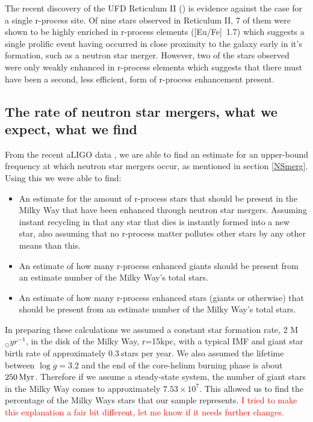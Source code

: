 \documentclass[a4paper,fleqn,usenatbib]{mnras}
\newcommand{\todo}[1]{\textcolor{red}{#1}}
\begin{document}
	The recent discovery of the UFD Reticulum II (\cite{Ji2016}) is evidence against the case for a single r-process site. Of nine stars observed in Reticulum II, 7 of them were shown to be highly enriched in r-process elements ([Eu/Fe]~1.7) which suggests a single prolific event having occurred in close proximity to the galaxy early in it's formation, such as a neutron star merger. However, two of the stars observed were only weakly enhanced in r-process elements which suggests that there must have been a second, less efficient, form of r-process enhancement present.
	
	\subsection{The rate of neutron star mergers, what we expect, what we find}
	From the recent aLIGO data \cite{LIGO2016}, we are able to find an estimate for an upper-bound frequency at which neutron star mergers occur, as mentioned in section \ref{NSmerg}. 
	Using this we were able to find:
	\begin{itemize}
		\item An estimate for the amount of r-process stars that should be present in the Milky Way that have been enhanced through neutron star mergers. Assuming instant recycling in that any star that dies is instantly formed into a new star, also assuming that no r-process matter pollutes other stars by any other means than this. 
		\item An estimate of how many r-process enhanced giants should be present from an estimate number of the Milky Way's total stars.
		\item An estimate of how many r-process enhanced stars (giants or otherwise) that should be present from an estimate number of the Milky Way's total stars.
	\end{itemize}
	
	In preparing these calculations we assumed a constant star formation rate, 2 M$_\odot yr^{-1}$, in the disk of the Milky Way, r=15kpc, with a typical IMF and giant star birth rate of approximately $0.3\ $stars per year. We also assumed the lifetime between $\log{g} = 3.2$ and the end of the core-helium burning phase is about $250\,{\rm Myr}$. Therefore if we assume a steady-state system, the number of giant stars in the Milky Way comes to approximately $7.53\times10^7$. This allowed us to find the percentage of the Milky Ways stars that our sample represents. \todo{I tried to make this explanation a fair bit different, let me know if it needs further changes.}
	
\end{document}
